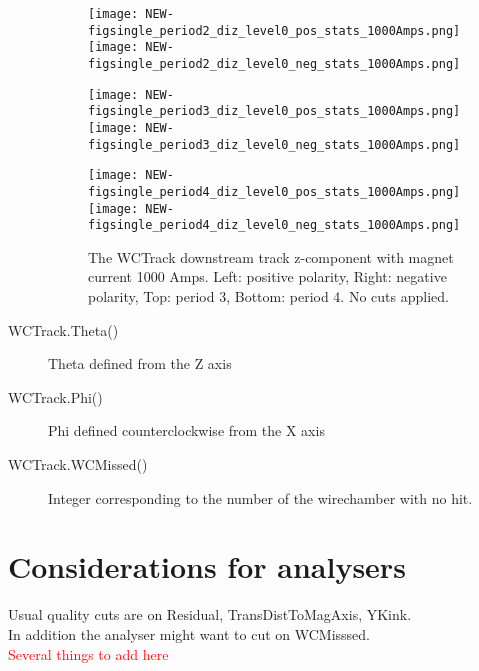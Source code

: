 \begin{description}
{         \begin{figure}[h]	
         \centering   
        	\texttt{[image: NEW-figsingle\_period2\_diz\_level0\_pos\_stats\_1000Amps.png]}
	 \texttt{[image: NEW-figsingle\_period2\_diz\_level0\_neg\_stats\_1000Amps.png]}
	 
   	\texttt{[image: NEW-figsingle\_period3\_diz\_level0\_pos\_stats\_1000Amps.png]}
	 \texttt{[image: NEW-figsingle\_period3\_diz\_level0\_neg\_stats\_1000Amps.png]}
	 
 	\texttt{[image: NEW-figsingle\_period4\_diz\_level0\_pos\_stats\_1000Amps.png]}
	 \texttt{[image: NEW-figsingle\_period4\_diz\_level0\_neg\_stats\_1000Amps.png]}
   \caption[short]{The WCTrack downstream track z-component with magnet current 1000 Amps. Left: positive polarity, Right: negative polarity, Top: period 3, Bottom: period 4. No cuts applied.}
   \label{fig_diz}
  \end{figure}
  
}
\item[WCTrack.Theta()]{
Theta defined from the Z axis 
}
\item[WCTrack.Phi()]{
Phi defined counterclockwise from the X axis 
}

        

         
\item[WCTrack.WCMissed()]{
Integer corresponding to the number of the wirechamber with no hit.
}
\end{description}
 

 
  \section{Considerations for analysers}
  
  Usual quality cuts are on Residual, TransDistToMagAxis, YKink.\\
  
  In addition the analyser might want to cut on WCMisssed.\\
  
  \textcolor{red}{Several things to add here}


